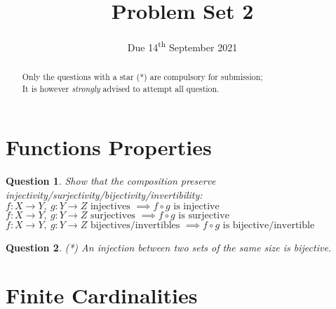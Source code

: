 \documentclass[]{article}
\title{Problem Set 2}
\author{}
\date{Due 14\textsuperscript{th} September 2021}
\newtheorem{question}{Question}
\begin{document}
\maketitle

\begin{abstract}
	Only the questions with a star (*) are compulsory for submission;\\
	It is however \textit{strongly} advised to attempt all question.
\end{abstract}

\section{Functions Properties}
\begin{question}
	Show that the composition preserve injectivity/surjectivity/bijectivity/invertibility:
	$f: X \to Y, \ g: Y \to Z \text{ injectives } \implies f \circ g \text{ is injective}$\\
	$f: X \to Y, \ g: Y \to Z \text{ surjectives } \implies f \circ g \text{ is surjective}$\\
	$f: X \to Y, \ g: Y \to Z \text{ bijectives/invertibles } \implies f \circ g \text{ is bijective/invertible}$
\end{question}
\begin{question}
	(*) An injection between two sets of the same size is bijective.
\end{question}

\section{Finite Cardinalities}
\end{document}
